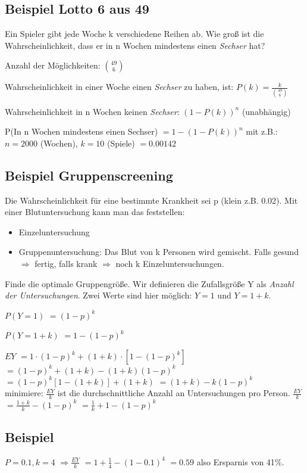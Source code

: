 \subsection{Beispiel Lotto 6 aus 49}
Ein Spieler gibt jede Woche k verschiedene Reihen ab. Wie groß ist die Wahrscheinlichkeit, dass er in n Wochen mindestens einen \textit{Sechser} hat?

Anzahl der Möglichkeiten: $\binom {49} 6$

Wahrscheinlichkeit in einer Woche einen \textit{Sechser} zu haben, ist: $P(k) = \frac{k}{\binom {49} 6}$

Wahrscheinlichkeit in n Wochen keinen \textit{Sechser}: $(1-P(k))^n$ (unabhängig)

P(In n Wochen mindestens einen Sechser)
$=1-(1-P(k))^n$
mit z.B.: $n=2000$ (Wochen), $k=10$ (Spiele)
\underline{$=0.00142$}

\subsection{Beispiel Gruppenscreening}
Die Wahrscheinlichkeit für eine bestimmte Krankheit sei p (klein z.B. 0.02). Mit einer Blutuntersuchung kann man das feststellen:
\begin{itemize}
\item Einzeluntersuchung
\item Gruppenuntersuchung: Das Blut von k Personen wird gemischt. %
Falls gesund $\Rightarrow$ fertig, falls krank $\Rightarrow$ noch k Einzeluntersuchungen. 
\end{itemize}
Finde die optimale Gruppengröße. Wir definieren die Zufallsgröße Y als \textit{Anzahl der Untersuchungen}. Zwei Werte sind hier möglich: $Y=1$ und $Y=1+k$. 

$P(Y=1)$
$=(1-p)^k$

$P(Y=1+k)$
$=1-(1-p)^k$

$EY$
$=1\cdot (1-p)^k + (1+k) \cdot [1-(1-p)^k]$
$=(1-p)^k + (1+k) - (1+k)(1-p)^k$
$=(1-p)^k [1-(1+k)] + (1+k)$
$=(1+k) - k(1-p)^k$\\

minimiere: $\frac{EY}{k}$ ist die durchschnittliche Anzahl an Untersuchungen pro Person. 
$\frac{EY}{k}$ 
$=\frac{1+k}{k} - (1-p)^k$
$=\frac{1}{k} + 1 - (1-p)^k$

\subsection{Beispiel}
$P=0.1, k=4$
$\Rightarrow \frac{EY}{k}$
$=1 + \frac{1}{4} - (1 - 0.1)^4$
$=0.59$ also Ersparnis von 41\%.

